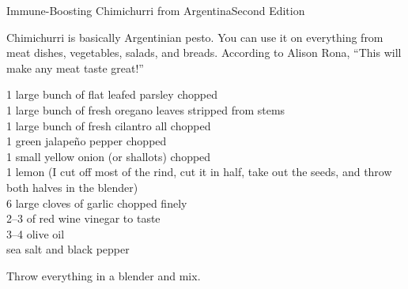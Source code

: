 \begin{entry}{Immune-Boosting Chimichurri from Argentina}{Second Edition}

\begin{open}
    Chimichurri is basically Argentinian pesto.  You can use it on everything
    from meat dishes, vegetables, salads, and breads.  According to Alison Rona, ``This will make any meat taste great!''
\end{open}
\begin{ingredients}
    1 large bunch of flat leafed parsley chopped\\
    1 large bunch of fresh oregano leaves stripped from stems\\
    1 large bunch of fresh cilantro all chopped\\
    1 green jalape\~{n}o pepper chopped\\
    1 small yellow onion (or shallots) chopped\\
    1 lemon (I cut off most of the rind, cut it in half, take out the seeds, and
    throw both halves in the blender)\\
    6 large cloves of garlic chopped finely\\
    \SIrange{2}{3}{\tblspoon} of red wine vinegar to taste\\
    \SIrange{3}{4}{\tblspoon} olive oil\\
    sea salt and black pepper
\end{ingredients}
Throw everything in a blender and mix.
\end{entry}


